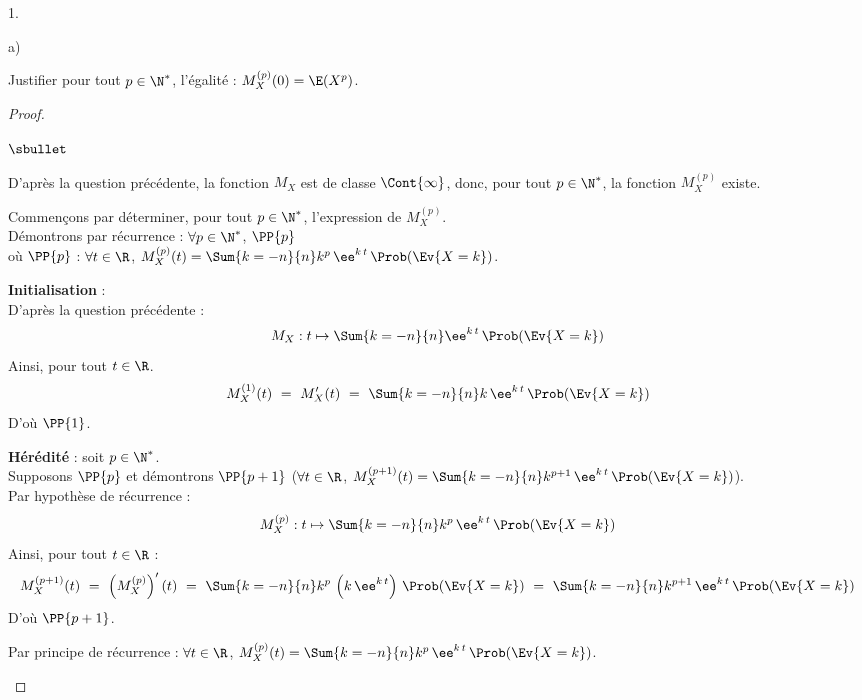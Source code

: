 \documentclass[11pt]{article}%
\begin{document}
\begin{noliste}{1.}
\begin{noliste}{a)}
    \newpage
    
    
  \item Justifier pour tout $p \in \N^*$, l'égalité : $M_X^{(p)}(0) =
    \E(X^p)$.
    \begin{proof}~
      \begin{noliste}{$\sbullet$}
      \item D'après la question précédente, la fonction $M_X$ est de
        classe $\Cont{\infty}$, donc, pour tout $p \in \N^*$, la
        fonction $M_X^{(p)}$ existe.
        
      \item Commençons par déterminer, pour tout $p \in \N^*$,
        l'expression de $M_X^{(p)}$.\\
        Démontrons par récurrence : $\forall p \in \N^*$, $\PP{p}$\\ 
        où \quad $\PP{p}$ : $\forall t \in \R$, $M_X^{(p)}(t) =
        \Sum{k=-n}{n} k^p \, \ee^{k \, t} \, \Prob(\Ev{X = k})$.
        \begin{noliste}{\fitem}
        \item {\bf Initialisation} :\\
          D'après la question précédente :
          \[
            M_X : t \mapsto \Sum{k=-n}{n} \ee^{k \, t} \, \Prob(\Ev{X
              = k})
          \]
          Ainsi, pour tout $t \in \R$.
          \[
            M_X^{(1)}(t) \ = \ M_X'(t) \ = \ \Sum{k=-n}{n} k \, \ee^{k
              \, t} \, \Prob(\Ev{X = k})
          \]
          D'où $\PP{1}$.
          
        \item {\bf Hérédité} : soit $p \in \N^* $.\\
          Supposons $\PP{p}$ et démontrons $\PP{p+1}$ (\ie $\forall t
          \in \R$, $M_X^{(p+1)}(t) = \Sum{k=-n}{n} k^{p+1} \, \ee^{k
            \, t} \, \Prob(\Ev{X = k})$).\\
          Par hypothèse de récurrence :
          \[
            M_X^{(p)} : t \mapsto \Sum{k=-n}{n} k^p \, \ee^{k \, t} \,
            \Prob(\Ev{X = k})
          \]
          Ainsi, pour tout $t \in \R$ :
          \[
            M_X^{(p+1)}(t) \ = \ \left(M_X^{(p)}\right)'(t) \ = \
            \Sum{k=-n}{n} k^p \, \left(k \, \ee^{k \, t}\right) \,
            \Prob(\Ev{X = k}) \ = \ \Sum{k=-n}{n} k^{p+1} \, \ee^{k \,
              t} \, \Prob(\Ev{X = k})
          \]
          D'où $\PP{p+1}$.
        \end{noliste}
        Par principe de récurrence : $\forall t \in \R$, $M_X^{(p)}(t)
        = \Sum{k=-n}{n} k^p \, \ee^{k \, t} \, \Prob(\Ev{X = k})$.
        

\end{noliste}
\end{proof}
\end{noliste}
\end{noliste}
\end{document}
